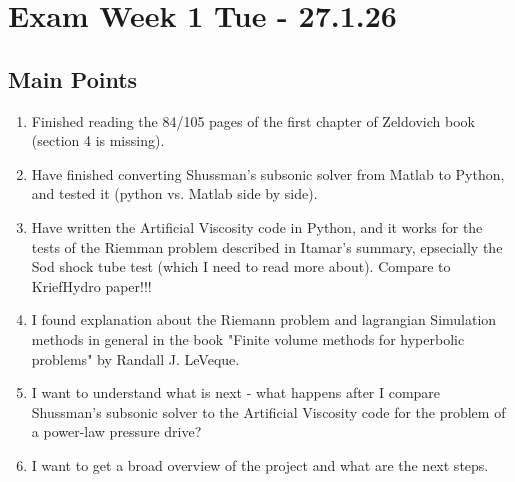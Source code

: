\documentclass[11pt]{article}
\begin{document}
\section{Exam Week 1 Tue - 27.1.26}
\subsection{Main Points}
\begin{enumerate}
    \item Finished reading the 84/105 pages of the first chapter of Zeldovich book (section 4 is missing).
    \item Have finished converting Shussman's subsonic solver from Matlab to Python, and tested it (python vs. Matlab side by side).
    \item Have written the Artificial Viscosity code in Python, and it works for the tests of the Riemman problem described in Itamar's summary, epsecially the Sod shock tube test (which I need to read more about). Compare to KriefHydro paper!!!
    \item I found explanation about the Riemann problem and lagrangian Simulation methods in general in the book "Finite volume methods for hyperbolic problems" by Randall J. LeVeque.
    \item I want to understand what is next - what happens after I compare Shussman's subsonic solver to the Artificial Viscosity code for the problem of a power-law pressure drive?
    \item I want to get a broad overview of the project and what are the next steps.
\end{enumerate}
\end{document}
